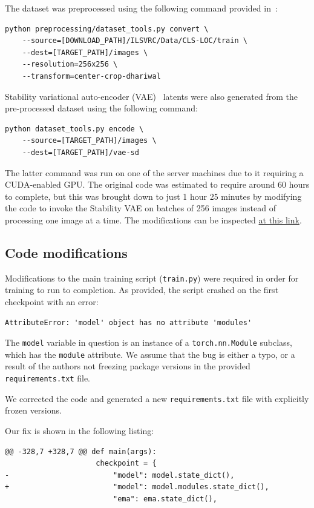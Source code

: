 \documentclass{article}
\begin{document}
The dataset was preprocessed using the following command provided in~\cite{reparepo}:
\begin{verbatim}
python preprocessing/dataset_tools.py convert \
    --source=[DOWNLOAD_PATH]/ILSVRC/Data/CLS-LOC/train \
    --dest=[TARGET_PATH]/images \
    --resolution=256x256 \
    --transform=center-crop-dhariwal
\end{verbatim}

Stability variational auto-encoder (VAE)~\cite{stabvae} latents were also generated from the pre-processed dataset using the following command:
\begin{verbatim}
python dataset_tools.py encode \
    --source=[TARGET_PATH]/images \
    --dest=[TARGET_PATH]/vae-sd
\end{verbatim}
The latter command was run on one of the server machines due to it requiring a CUDA-enabled GPU. The original code was estimated to require around 60 hours to complete, but this was brought down to just 1 hour 25 minutes by modifying the code to invoke the Stability VAE on batches of 256 images instead of processing one image at a time. The modifications can be inspected \href{https://github.com/MarkMizzi/REPA/blob/main/preprocessing/dataset_tools.py#L398-L431}{at this link}.

\subsection{Code modifications}

Modifications to the main training script (\texttt{train.py}) were required in order for training to run to completion. As provided, the script crashed on the first checkpoint with an error:
\begin{verbatim}
AttributeError: 'model' object has no attribute 'modules'
\end{verbatim}
The \texttt{model} variable in question is an instance of a  \texttt{torch.nn.Module} subclass, which has the \texttt{module} attribute. We assume that the bug is either a typo, or a result of the authors not freezing package versions in the provided \texttt{requirements.txt} file.

We corrected the code and generated a new \texttt{requirements.txt} file with explicitly frozen versions.

Our fix is shown in the following listing:
\begin{verbatim}
@@ -328,7 +328,7 @@ def main(args):
                     checkpoint = {
-                        "model": model.state_dict(),
+                        "model": model.modules.state_dict(),
                         "ema": ema.state_dict(),
\end{verbatim}
\end{document}
